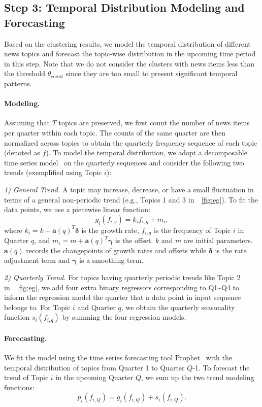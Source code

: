 \documentclass[11pt]{article}
\begin{document}
\subsection{Step 3: Temporal Distribution Modeling and Forecasting}
Based on the clustering results, we model the temporal distribution of different news topics and forecast the topic-wise distribution in the upcoming time period in this step.
Note that we do not consider the clusters with news items less than the threshold $\theta_{count}$ since they are too small to present significant temporal patterns. 

\paragraph{Modeling.} 
Assuming that $T$ topics are preserved, we first count the number of news items per quarter within each topic. The counts of the same quarter are then normalized across topics to obtain the quarterly frequency sequence of each topic (denoted as $f$). To model the temporal distribution, we adopt a decomposable time series model~\cite{harvey1990estimation} on the quarterly sequences and consider the following two trends (exemplified using Topic $i$):

\textit{1) General Trend.} A topic may increase, decrease, or have a small fluctuation in terms of a general non-periodic trend (e.g., Topics 1 and 3 in~\figurename~\ref{fig:eg}). To fit the data points, we use a piecewise linear function:
\begin{equation}
        g_i(f_{i,q})=k_i f_{i,q}+m_i,
\end{equation}
where $k_i=k+\bm{a}(q)^T\bm{\delta}$ is the growth rate, $f_{i,q}$ is the frequency of Topic $i$ in Quarter $q$, and $m_i=m+\bm{a}(q)^T\bm{\gamma}$ is the offset. $k$ and $m$ are initial parameters. $\bm{a}(q)$ records the changepoints of growth rates and offsets while $\bm{\delta}$ is the rate adjustment term and $\bm{\gamma}$ is a smoothing term.

\textit{2) Quarterly Trend.}
For topics having quarterly periodic trends like Topic 2 in~\figurename~\ref{fig:eg}, we add four extra binary regressors corresponding to Q1\textasciitilde Q4 to inform the regression model the quarter that a data point in input sequence belongs to. For Topic $i$ and Quarter $q$, we obtain the quarterly seasonality function $s_i(f_{i,q})$ by summing the four regression models.

\paragraph{Forecasting.} 
We fit the model using the time series forecasting tool Prophet~\cite{prophet} with the temporal distribution of topics from Quarter 1 to Quarter $Q$-1. To forecast the trend of Topic $i$ in the upcoming Quarter $Q$, we sum up the two trend modeling functions:
\begin{equation}
    p_i(f_{i,Q}) = g_i(f_{i,Q}) + s_i(f_{i,Q}).
\end{equation}
\end{document}
